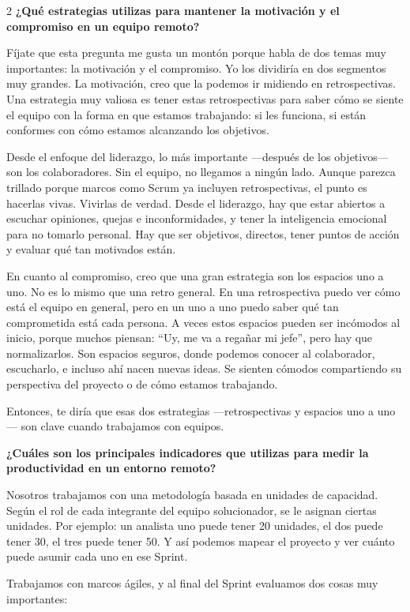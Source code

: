 \documentclass[12pt,spanish,Letterpaper,openany]{book}
\begin{document}
\begin {multicols}{2}
\textbf{¿Qué estrategias utilizas para mantener la motivación y el compromiso en un equipo remoto?}

Fíjate que esta pregunta me gusta un montón porque habla de dos temas muy importantes: la motivación y el compromiso.
Yo los dividiría en dos segmentos muy grandes. La motivación, creo que la podemos ir midiendo en retrospectivas. Una estrategia muy valiosa es tener estas retrospectivas para saber cómo se siente el equipo con la forma en que estamos trabajando: si les funciona, si están conformes con cómo estamos alcanzando los objetivos.

Desde el enfoque del liderazgo, lo más importante ---después de los objetivos--- son los colaboradores. Sin el equipo, no llegamos a ningún lado.
Aunque parezca trillado porque marcos como Scrum ya incluyen retrospectivas, el punto es hacerlas vivas. Vivirlas de verdad. Desde el liderazgo, hay que estar abiertos a escuchar opiniones, quejas e inconformidades, y tener la inteligencia emocional para no tomarlo personal. Hay que ser objetivos, directos, tener puntos de acción y evaluar qué tan motivados están.

En cuanto al compromiso, creo que una gran estrategia son los espacios uno a uno. No es lo mismo que una retro general. En una retrospectiva puedo ver cómo está el equipo en general, pero en un uno a uno puedo saber qué tan comprometida está cada persona.
A veces estos espacios pueden ser incómodos al inicio, porque muchos piensan: ``Uy, me va a regañar mi jefe'', pero hay que normalizarlos. Son espacios seguros, donde podemos conocer al colaborador, escucharlo, e incluso ahí nacen nuevas ideas. Se sienten cómodos compartiendo su perspectiva del proyecto o de cómo estamos trabajando.

Entonces, te diría que esas dos estrategias ---retrospectivas y espacios uno a uno--- son clave cuando trabajamos con equipos.

\textbf{¿Cuáles son los principales indicadores que utilizas para medir la productividad en un entorno remoto?}

Nosotros trabajamos con una metodología basada en unidades de capacidad. Según el rol de cada integrante del equipo solucionador, se le asignan ciertas unidades. Por ejemplo: un analista uno puede tener 20 unidades, el dos puede tener 30, el tres puede tener 50. Y así podemos mapear el proyecto y ver cuánto puede asumir cada uno en ese Sprint.

Trabajamos con marcos ágiles, y al final del Sprint evaluamos dos cosas muy importantes:


\end{multicols}
\end{document}
